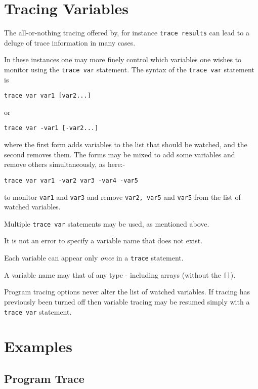 \section{Tracing Variables}
The all-or-nothing tracing offered by, for instance \texttt{trace results} can lead to a deluge of trace information in many cases.

In these instances one may more finely control which variables one wishes to monitor using the \texttt{trace var} statement.
The syntax of the \texttt{trace var} statement is 
\begin{verbatim}
trace var var1 [var2...]
\end{verbatim}
or
\begin{verbatim}
trace var -var1 [-var2...]
\end{verbatim}
where the first form adds variables to the list that should be watched, and the second removes them. The forms may be mixed to add some variables and remove others simultaneously, as here:-
\begin{verbatim}
trace var var1 -var2 var3 -var4 -var5
\end{verbatim}
to  monitor \texttt{var1} and \texttt{var3} and remove \texttt{var2, var5} and \texttt{var5} from the list of watched variables. 

Multiple \texttt{trace var} statements may be used, as mentioned above.

It is not an error to specify a variable name that does not exist.

Each variable can appear only \textit{once} in a \texttt{trace} statement.

A variable name may that of any type - including arrays (without the \texttt{[]}).

Program tracing options never alter the list of watched variables. If tracing has previously been turned off then variable tracing may be resumed simply with a \texttt{trace var} statement.

\section{Examples}
\subsection{Program Trace}
